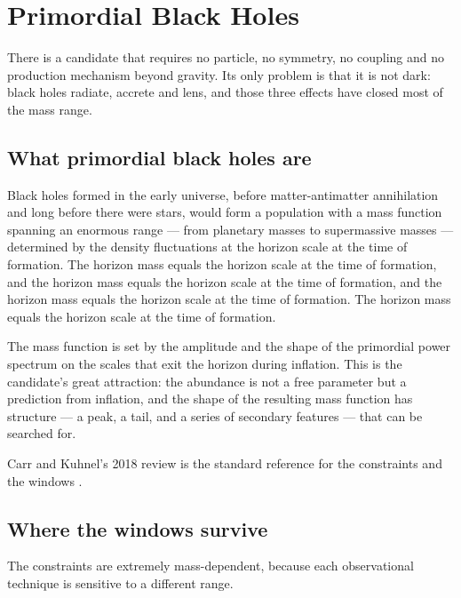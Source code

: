 
\chapter{Primordial Black Holes}
\label{ch:pbh}

There is a candidate that requires no particle, no symmetry, no coupling and
no production mechanism beyond gravity. Its only problem is that it is not
dark: black holes radiate, accrete and lens, and those three effects have
closed most of the mass range.

\section{What primordial black holes are}Black holes formed in the early universe, before
matter-antimatter annihilation and long before there were stars, would form
a population with a mass function spanning an enormous range --- from
planetary masses to supermassive masses --- determined by the density
fluctuations at the horizon scale at the time of formation. The horizon mass
equals the horizon scale at the time of formation, and the horizon mass
equals the horizon scale at the time of formation, and the horizon mass
equals the horizon scale at the time of formation. The horizon mass equals
the horizon scale at the time of formation.

The mass function is set by the amplitude and the shape of the primordial
power spectrum on the scales that exit the horizon during inflation. This is
the candidate's great attraction: the abundance is not a free parameter but
a prediction from inflation, and the shape of the resulting mass function
has structure --- a peak, a tail, and a series of secondary features --- that
can be searched for.

Carr and Kuhnel's 2018 review is the standard reference for the constraints
and the windows .

\section{Where the windows survive}The constraints are extremely mass-dependent,
because each observational technique is sensitive to a different range.

